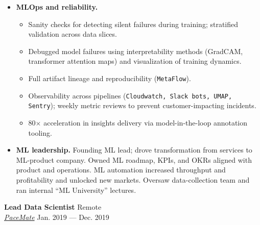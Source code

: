 \documentclass[a4paper,12pt]{article}
\newcommand{\ressubheading}[4]{{\begin{minipage}{\textwidth}
                                    \textbf{#1} \hfill #2 \\
                                    \textit{#3} \hfill #4 \\
\end{minipage}}}
\begin{document}
\begin{itemize}
\begin{itemize}
            \item Researched, experimented, and productionized novel ML techniques: models, samplers, optimization functions, augmentations.
        \end{itemize}
        \item \textbf{MLOps and reliability.}
        \begin{itemize}
            \item Sanity checks for detecting silent failures during training; stratified validation across data slices.
            \item Debugged model failures using interpretability methods (GradCAM, transformer attention maps) and visualization of training dynamics.
            \item Full artifact lineage and reproducibility (\texttt{MetaFlow}).
            \item Observability across pipelines (\texttt{Cloudwatch, Slack bots, UMAP, Sentry}); weekly metric reviews to prevent customer-impacting incidents.
            \item 80$\times$ acceleration in insights delivery via model-in-the-loop annotation tooling.
        \end{itemize}
        \item \textbf{ML leadership.} Founding ML lead; drove transformation from services to ML-product company. Owned ML roadmap, KPIs, and OKRs aligned with product and operations. ML automation increased throughput and profitability and unlocked new markets. Oversaw data-collection team and ran internal ``ML University'' lectures.
    \end{itemize}


    \ressubheading{Lead Data Scientist}{Remote}{\href{https://pacemate.com/}{PaceMate}}{Jan. 2019 --- Dec. 2019}
\end{document}
